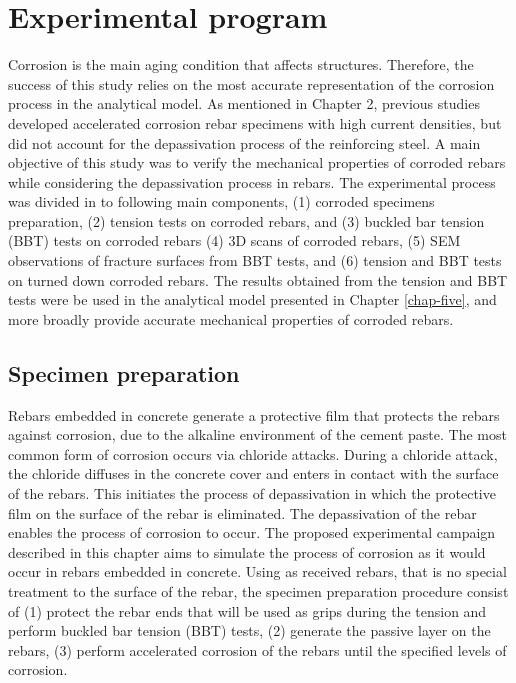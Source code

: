 \chapter{Experimental program}
\label{chap-three}

Corrosion is the main aging condition that affects structures. Therefore, the success of this study relies on the most accurate representation of the corrosion process in the analytical model. As mentioned in Chapter 2, previous studies developed accelerated corrosion rebar specimens with high current densities, but did not account for the depassivation process of the reinforcing steel. A main objective of this study was to verify the mechanical properties of corroded rebars while considering the depassivation process in rebars. The experimental process was divided in to following main components, (1) corroded specimens preparation, (2) tension tests on corroded rebars, and (3) buckled bar tension (BBT) tests on corroded rebars (4) 3D scans of corroded rebars, (5) SEM observations of fracture surfaces from BBT tests, and (6) tension and BBT tests on turned down corroded rebars. The results obtained from the tension and BBT tests were be used in the analytical model presented in Chapter \ref{chap-five}, and more broadly provide accurate mechanical properties of corroded rebars.

\section{Specimen preparation}

Rebars embedded in concrete generate a protective film that protects the rebars against corrosion, due to the alkaline environment of the cement paste. The most common form of corrosion occurs via chloride attacks. During a chloride attack, the chloride diffuses in the concrete cover and enters in contact with the surface of the rebars. This initiates the process of depassivation in which the protective film on the surface of the rebar is eliminated. The depassivation of the rebar enables the process of corrosion to occur. The proposed experimental campaign described in this chapter aims to simulate the process of corrosion as it would occur in rebars embedded in concrete. Using as received rebars, that is no special treatment to the surface of the rebar, the specimen preparation procedure consist of (1) protect the rebar ends that will be used as grips during the tension and perform buckled bar tension (BBT) tests, (2)  generate the passive layer on the rebars, (3) perform accelerated corrosion of the rebars until the specified levels of corrosion.

